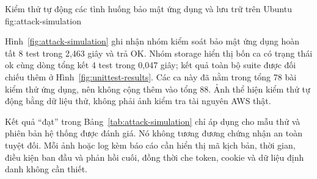 {Kiểm thử tự động các tình huống bảo mật ứng dụng và lưu trữ trên Ubuntu}
{fig:attack-simulation}

Hình~\ref{fig:attack-simulation} ghi nhận nhóm kiểm soát bảo mật ứng dụng hoàn tất 8 test trong 2,463 giây và trả OK. Nhóm storage hiển thị bốn ca có trạng thái ok cùng dòng tổng kết 4 test trong 0,047 giây; kết quả toàn bộ suite được đối chiếu thêm ở Hình~\ref{fig:unittest-results}. Các ca này đã nằm trong tổng 78 bài kiểm thử ứng dụng, nên không cộng thêm vào tổng 88. Ảnh thể hiện kiểm thử tự động bằng dữ liệu thử, không phải ảnh kiểm tra tài nguyên AWS thật.

Kết quả ``đạt'' trong Bảng~\ref{tab:attack-simulation} chỉ áp dụng cho mẫu thử và phiên bản hệ thống được đánh giá. Nó không tương đương chứng nhận an toàn tuyệt đối. Mỗi ảnh hoặc log kèm báo cáo cần hiển thị mã kịch bản, thời gian, điều kiện ban đầu và phản hồi cuối, đồng thời che token, cookie và dữ liệu định danh không cần thiết.

